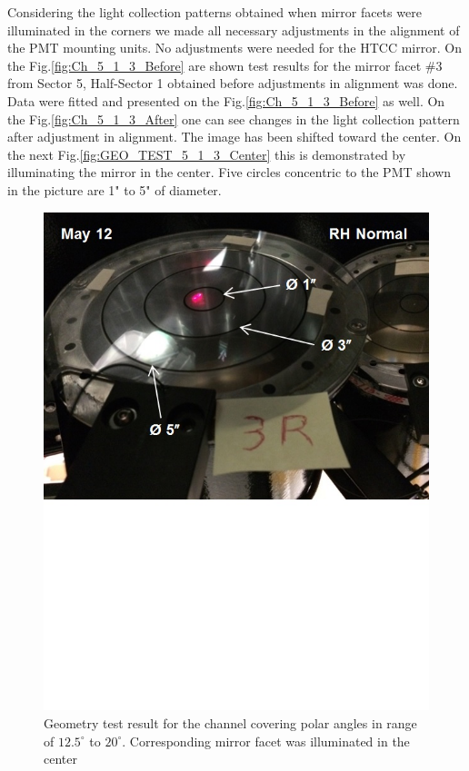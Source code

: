 \indent Considering the light collection patterns obtained when mirror facets were illuminated in the corners we made all necessary adjustments in the alignment of the PMT mounting units. No adjustments were needed for the HTCC mirror. On the Fig.\ref{fig:Ch_5_1_3_Before} are shown test results for the mirror facet \#3 from Sector 5, Half-Sector 1 obtained before adjustments in alignment was done. Data were fitted and presented on the Fig.\ref{fig:Ch_5_1_3_Before} as well. On the Fig.\ref{fig:Ch_5_1_3_After} one can see changes in the light collection pattern after adjustment in alignment. The image has been shifted toward the center. On the next Fig.\ref{fig:GEO_TEST_5_1_3_Center} this is demonstrated by illuminating the mirror in the center. Five circles concentric to the PMT shown in the picture are 1" to 5" of diameter. 


\begin{figure}[ht]
    \centering
    \includegraphics[width=1.0\linewidth,trim={0 8.5cm 0 0},clip]{images/GEO_TEST_3_Normal.jpg}
    \caption{Geometry test result for the channel covering polar angles in range of $12.5^\circ$ to $20^\circ$. Corresponding mirror facet was illuminated in the center}
    \label{fig:GEO_TEST_3_Normal}
\end{figure}

